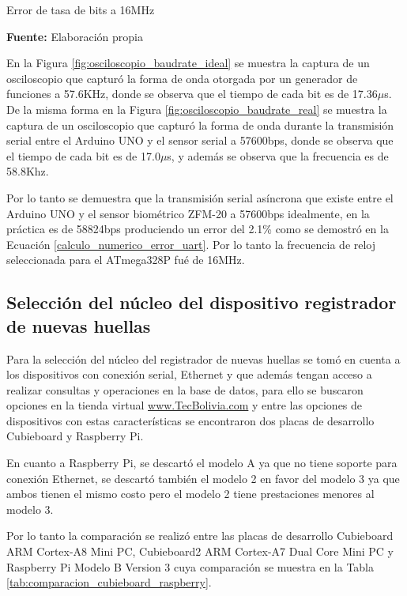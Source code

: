 \documentclass[../principal]{subfiles}
\begin{document}
  \begin{table}[H]
    \caption{Error de tasa de bits a 16MHz}
    \label{tabla_error_tasa_clock_uart_16MHz}
    \centering
    
    \caption*{\textbf{Fuente:} Elaboración propia}
  \end{table}

  En la Figura \ref{fig:osciloscopio_baudrate_ideal} se muestra la captura de un osciloscopio que capturó la forma de onda otorgada por un generador de funciones a 57.6KHz, donde se observa que el tiempo de cada bit es de 17.36$ \mu $s. De la misma forma en la Figura \ref{fig:osciloscopio_baudrate_real} se muestra la captura de un osciloscopio que capturó la forma de onda durante la transmisión serial entre el Arduino UNO y el sensor serial a 57600bps, donde se observa que el tiempo de cada bit es de 17.0$ \mu $s, y además se observa que la frecuencia es de 58.8Khz.

  Por lo tanto se demuestra que la transmisión serial asíncrona que existe entre el Arduino UNO y el sensor biométrico ZFM-20 a 57600bps idealmente, en la práctica es de 58824bps produciendo un error del 2.1\% como se demostró en la Ecuación \ref{calculo_numerico_error_uart}. Por lo tanto la frecuencia de reloj seleccionada para el ATmega328P fué de 16MHz.

  \subsection{Selección del núcleo del dispositivo registrador de nuevas huellas}

  Para la selección del núcleo del registrador de nuevas huellas se tomó en cuenta a los dispositivos con conexión serial, Ethernet y que además tengan acceso a realizar consultas y operaciones en la base de datos, para ello se buscaron opciones en la tienda virtual \href{www.TecBolivia.com}{www.TecBolivia.com} y entre las opciones de dispositivos con estas características se encontraron dos placas de desarrollo Cubieboard y Raspberry Pi.

  En cuanto a Raspberry Pi, se descartó el modelo A ya que no tiene soporte para conexión Ethernet, se descartó también el modelo 2 en favor del modelo 3 ya que ambos tienen el mismo costo pero el modelo 2 tiene prestaciones menores al modelo 3. 

  Por lo tanto la comparación se realizó entre las placas de desarrollo Cubieboard ARM Cortex-A8 Mini PC, Cubieboard2 ARM Cortex-A7 Dual Core Mini PC y Raspberry Pi Modelo B Version 3 cuya comparación se muestra en la Tabla \ref{tab:comparacion_cubieboard_raspberry}.
\end{document}
